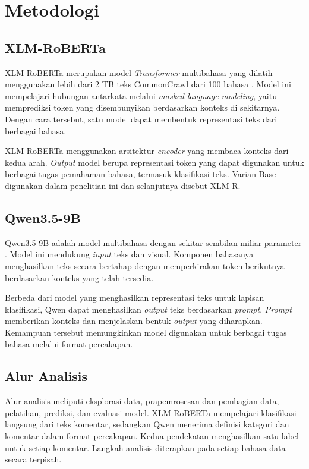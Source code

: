 \documentclass[11pt]{article}
\begin{document}
\section{Metodologi}
\subsection{XLM-RoBERTa}
XLM-RoBERTa merupakan model \textit{Transformer} multibahasa yang dilatih menggunakan lebih dari 2 TB teks CommonCrawl dari 100 bahasa \citep{conneau-etal-2020-unsupervised}. Model ini mempelajari hubungan antarkata melalui \textit{masked language modeling}, yaitu memprediksi token yang disembunyikan berdasarkan konteks di sekitarnya. Dengan cara tersebut, satu model dapat membentuk representasi teks dari berbagai bahasa.

XLM-RoBERTa menggunakan arsitektur \textit{encoder} yang membaca konteks dari kedua arah. \textit{Output} model berupa representasi token yang dapat digunakan untuk berbagai tugas pemahaman bahasa, termasuk klasifikasi teks. Varian Base digunakan dalam penelitian ini dan selanjutnya disebut XLM-R.

\subsection{Qwen3.5-9B}
Qwen3.5-9B adalah model multibahasa dengan sekitar sembilan miliar parameter \citep{qwen-team-2026-qwen35}. Model ini mendukung \textit{input} teks dan visual. Komponen bahasanya menghasilkan teks secara bertahap dengan memperkirakan token berikutnya berdasarkan konteks yang telah tersedia.

Berbeda dari model yang menghasilkan representasi teks untuk lapisan klasifikasi, Qwen dapat menghasilkan \textit{output} teks berdasarkan \textit{prompt}. \textit{Prompt} memberikan konteks dan menjelaskan bentuk \textit{output} yang diharapkan. Kemampuan tersebut memungkinkan model digunakan untuk berbagai tugas bahasa melalui format percakapan.

\subsection{Alur Analisis}
Alur analisis meliputi eksplorasi data, prapemrosesan dan pembagian data, pelatihan, prediksi, dan evaluasi model. XLM-RoBERTa mempelajari klasifikasi langsung dari teks komentar, sedangkan Qwen menerima definisi kategori dan komentar dalam format percakapan. Kedua pendekatan menghasilkan satu label untuk setiap komentar. Langkah analisis diterapkan pada setiap bahasa data secara terpisah.
\end{document}
